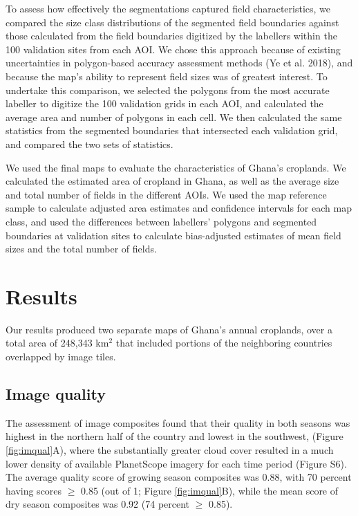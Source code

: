 \documentclass[11pt,a4paper]{article}
\begin{document}
To assess how effectively the segmentations captured field
characteristics, we compared the size class distributions of the
segmented field boundaries against those calculated from the field
boundaries digitized by the labellers within the 100 validation sites
from each AOI. We chose this approach because of existing uncertainties
in polygon-based accuracy assessment methods (Ye et al. 2018), and
because the map's ability to represent field sizes was of greatest
interest. To undertake this comparison, we selected the polygons from
the most accurate labeller to digitize the 100 validation grids in each
AOI, and calculated the average area and number of polygons in each
cell. We then calculated the same statistics from the segmented
boundaries that intersected each validation grid, and compared the two
sets of statistics.

We used the final maps to evaluate the characteristics of Ghana's
croplands. We calculated the estimated area of cropland in Ghana, as
well as the average size and total number of fields in the different
AOIs. We used the map reference sample to calculate adjusted area
estimates and confidence intervals for each map class, and used the
differences between labellers' polygons and segmented boundaries at
validation sites to calculate bias-adjusted estimates of mean field
sizes and the total number of fields.

\hypertarget{results}{%
\section{Results}\label{results}}

Our results produced two separate maps of Ghana's annual croplands, over
a total area of 248,343 km\(^2\) that included portions of the
neighboring countries overlapped by image tiles.

\hypertarget{image-quality}{%
\subsection{Image quality}\label{image-quality}}

The assessment of image composites found that their quality in both
seasons was highest in the northern half of the country and lowest in
the southwest, (Figure \ref{fig:imqual}A), where the substantially
greater cloud cover resulted in a much lower density of available
PlanetScope imagery for each time period (Figure S6). The average
quality score of growing season composites was 0.88, with 70 percent
having scores \(\geq\) 0.85 (out of 1; Figure \ref{fig:imqual}B), while
the mean score of dry season composites was 0.92 (74 percent \(\geq\)
0.85).
\end{document}
